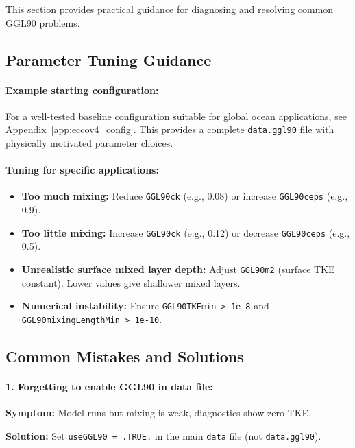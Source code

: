 \documentclass[12pt,letterpaper]{article}
\begin{document}
This section provides practical guidance for diagnosing and resolving common GGL90 problems.

\subsection{Parameter Tuning Guidance}

\paragraph{Example starting configuration:}

For a well-tested baseline configuration suitable for global ocean applications, see Appendix~\ref{app:eccov4_config}. This provides a complete \texttt{data.ggl90} file with physically motivated parameter choices.

\paragraph{Tuning for specific applications:}
\begin{itemize}
\item \textbf{Too much mixing:} Reduce \verb|GGL90ck| (e.g., 0.08) or increase \verb|GGL90ceps| (e.g., 0.9).
\item \textbf{Too little mixing:} Increase \verb|GGL90ck| (e.g., 0.12) or decrease \verb|GGL90ceps| (e.g., 0.5).
\item \textbf{Unrealistic surface mixed layer depth:} Adjust \verb|GGL90m2| (surface TKE constant). Lower values give shallower mixed layers.
\item \textbf{Numerical instability:} Ensure \verb|GGL90TKEmin > 1e-8| and \verb|GGL90mixingLengthMin > 1e-10|.
\end{itemize}

\subsection{Common Mistakes and Solutions}

\paragraph{1. Forgetting to enable GGL90 in data file:}

\textbf{Symptom:} Model runs but mixing is weak, diagnostics show zero TKE.

\textbf{Solution:} Set \verb|useGGL90 = .TRUE.| in the main \verb|data| file (not \verb|data.ggl90|).
\end{document}
